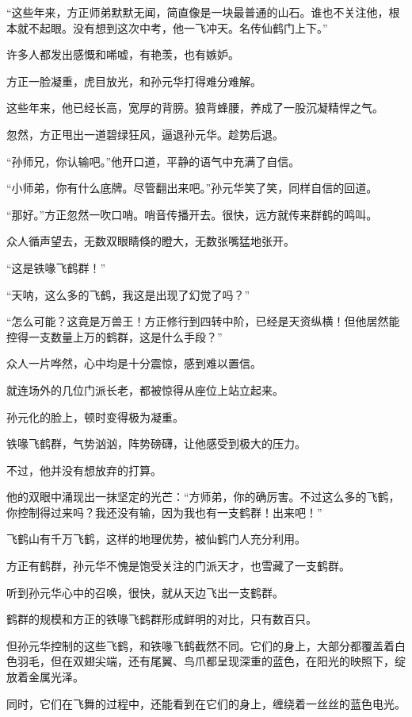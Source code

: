 \begin{this_body}
“这些年来，方正师弟默默无闻，简直像是一块最普通的山石。谁也不关注他，根本就不起眼。没有想到这次中考，他一飞冲天。名传仙鹤门上下。”

许多人都发出感慨和唏嘘，有艳羡，也有嫉妒。

方正一脸凝重，虎目放光，和孙元华打得难分难解。

这些年来，他已经长高，宽厚的背膀。狼背蜂腰，养成了一股沉凝精悍之气。

忽然，方正甩出一道碧绿狂风，逼退孙元华。趁势后退。

“孙师兄，你认输吧。”他开口道，平静的语气中充满了自信。

“小师弟，你有什么底牌。尽管翻出来吧。”孙元华笑了笑，同样自信的回道。

“那好。”方正忽然一吹口哨。哨音传播开去。很快，远方就传来群鹤的鸣叫。

众人循声望去，无数双眼睛倏的瞪大，无数张嘴猛地张开。

“这是铁喙飞鹤群！”

“天呐，这么多的飞鹤，我这是出现了幻觉了吗？”

“怎么可能？这竟是万兽王！方正修行到四转中阶，已经是天资纵横！但他居然能控得一支数量上万的鹤群，这是什么手段？”

众人一片哗然，心中均是十分震惊，感到难以置信。

就连场外的几位门派长老，都被惊得从座位上站立起来。

孙元化的脸上，顿时变得极为凝重。

铁喙飞鹤群，气势汹汹，阵势磅礴，让他感受到极大的压力。

不过，他并没有想放弃的打算。

他的双眼中涌现出一抹坚定的光芒：“方师弟，你的确厉害。不过这么多的飞鹤，你控制得过来吗？我还没有输，因为我也有一支鹤群！出来吧！”

飞鹤山有千万飞鹤，这样的地理优势，被仙鹤门人充分利用。

方正有鹤群，孙元华不愧是饱受关注的门派天才，也雪藏了一支鹤群。

听到孙元华心中的召唤，很快，就从天边飞出一支鹤群。

鹤群的规模和方正的铁喙飞鹤群形成鲜明的对比，只有数百只。

但孙元华控制的这些飞鹤，和铁喙飞鹤截然不同。它们的身上，大部分都覆盖着白色羽毛，但在双翅尖端，还有尾翼、鸟爪都呈现深重的蓝色，在阳光的映照下，绽放着金属光泽。

同时，它们在飞舞的过程中，还能看到在它们的身上，缠绕着一丝丝的蓝色电光。


\end{this_body}
